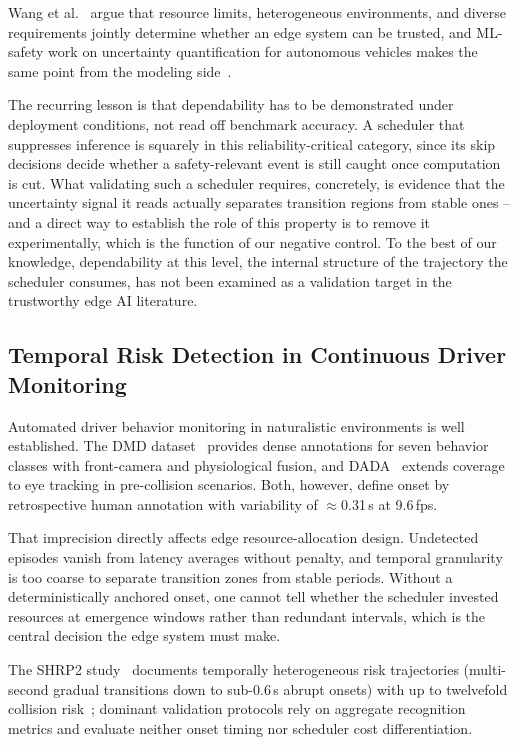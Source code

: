 \documentclass[a4paper,fleqn]{cas-dc}
\begin{document}
Wang et al.~\cite{wang2025trustworthy} argue that resource limits, heterogeneous
environments, and diverse requirements jointly determine whether an edge system can
be trusted, and ML-safety work on uncertainty quantification for autonomous vehicles
makes the same point from the modeling side~\cite{mcallister2017concrete,mohseni2020mlsafety,hendrycks2022mlsafety}.

The recurring lesson is that dependability has to be demonstrated under deployment
conditions, not read off benchmark accuracy. A scheduler that suppresses inference
is squarely in this reliability-critical category, since its skip decisions decide
whether a safety-relevant event is still caught once computation is cut. What
validating such a scheduler requires, concretely, is evidence that the uncertainty
signal it reads actually separates transition regions from stable ones -- and a direct way to establish the role of this property is to remove it experimentally, which is the function of our negative control. To the best of our knowledge, dependability at this level, the
internal structure of the trajectory the scheduler consumes, has not been examined
as a validation target in the trustworthy edge AI literature.
\subsection{Temporal Risk Detection in Continuous Driver Monitoring}
\label{sec:rel_dms}
Automated driver behavior monitoring in naturalistic environments is well
established. The DMD dataset~\cite{ortega2020dmd} provides dense annotations
for seven behavior classes with front-camera and physiological fusion, and
DADA~\cite{fang2022dada} extends coverage to eye tracking in pre-collision
scenarios. Both, however, define onset by retrospective human annotation with
variability of $\approx$0.31\,s at 9.6\,fps.

That imprecision directly affects edge resource-allocation design. Undetected
episodes vanish from latency averages without penalty, and temporal granularity
is too coarse to separate transition zones from stable periods. Without a
deterministically anchored onset, one cannot tell whether the scheduler
invested resources at emergence windows rather than redundant intervals, which
is the central decision the edge system must make.

The SHRP2 study~\cite{dingus2016shrp2} documents temporally heterogeneous risk trajectories (multi-second gradual transitions down to sub-0.6\,s abrupt onsets) with up to twelvefold collision risk~\cite{bouhsissin2023driver}; dominant validation protocols rely on aggregate recognition metrics and evaluate neither onset timing nor scheduler cost differentiation.
\end{document}
